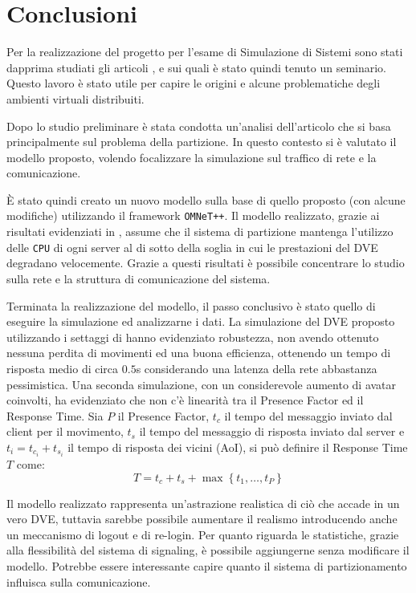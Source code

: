 \documentclass[a4paper, 11pt, oneside]{book}
\theoremstyle{definition}
\theoremstyle{remark}
\begin{document}
\chapter{Conclusioni}\label{conclusioni}
Per la realizzazione del progetto per l'esame di Simulazione di Sistemi
sono stati dapprima studiati gli articoli \cite{van}, \cite{zyda} e \cite{ghosh}
sui quali è stato quindi tenuto un seminario. Questo lavoro è stato utile per
capire le origini e alcune problematiche degli ambienti virtuali distribuiti.

Dopo lo studio preliminare è stata condotta un'analisi dell'articolo
\cite{IDVE} che si basa principalmente sul problema della partizione. In questo
contesto si è valutato il modello proposto, volendo focalizzare
la simulazione sul traffico di rete e la comunicazione.

\`E stato quindi creato un nuovo modello sulla base di quello proposto
(con alcune
modifiche) utilizzando il framework \texttt{OMNeT++}. Il modello realizzato,
grazie ai risultati evidenziati in \cite{IDVE}, assume che il sistema di
partizione mantenga l'utilizzo delle \texttt{CPU} di ogni server al di sotto
della soglia in cui le prestazioni del DVE degradano velocemente.
Grazie a questi risultati è possibile concentrare lo studio sulla rete e la
struttura di comunicazione del sistema.

Terminata la realizzazione del modello, il passo conclusivo è stato quello di
eseguire la simulazione ed analizzarne i dati. La simulazione del DVE proposto
utilizzando i settaggi di \cite{IDVE} hanno evidenziato robustezza, non avendo
ottenuto nessuna perdita di movimenti ed una buona efficienza, ottenendo un
tempo di risposta medio di circa $0.5$s considerando una latenza della rete
abbastanza pessimistica. Una seconda simulazione, con un considerevole aumento
di avatar coinvolti, ha evidenziato che non c'è linearità tra il Presence
Factor ed il Response Time. Sia $P$ il Presence Factor, $t_c$ il tempo
del messaggio inviato dal client per il movimento, $t_s$ il tempo del messaggio
di risposta inviato dal server e $t_i = t_{c_i} + t_{s_i}$ il tempo di risposta
dei vicini (AoI), si può definire il Response Time $T$ come:
\[
T = t_c + t_s + \max\left\{t_1, \ldots, t_{P}\right\}
\]

Il modello realizzato rappresenta un'astrazione realistica di ciò che accade
in un vero DVE, tuttavia sarebbe possibile aumentare il realismo introducendo
anche un meccanismo di logout e di re-login. Per quanto riguarda le statistiche,
grazie alla flessibilità del sistema di signaling, è possibile aggiungerne
senza modificare il modello. Potrebbe essere interessante capire quanto il
sistema di partizionamento influisca sulla comunicazione.
\end{document}
